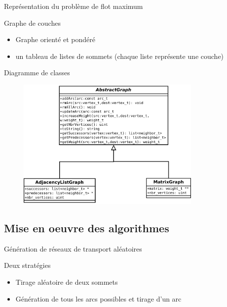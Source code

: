 \begin{frame}{Représentation du problème de flot maximum}
	\begin{block}{Graphe de couches}
  	\begin{itemize}
    	\item Graphe orienté et pondéré
  	  \item un tableau de listes de sommets (chaque liste représente une couche)
  	\end{itemize}
	\end{block}
\end{frame}

\begin{frame}{Diagramme de classes}
	\begin{figure}
	\includegraphics[width=0.8\textwidth]{img/diag_class.pdf}
	\end{figure}
\end{frame}

\subsection{Mise en oeuvre des algorithmes}
\begin{frame}{Génération de réseaux de transport aléatoires}
	\begin{block}{Deux stratégies}
  	\begin{itemize}
  		\item Tirage aléatoire de deux sommets
  		\item Génération de tous les arcs possibles et tirage d'un arc
  	\end{itemize}
	\end{block}
\end{frame}

